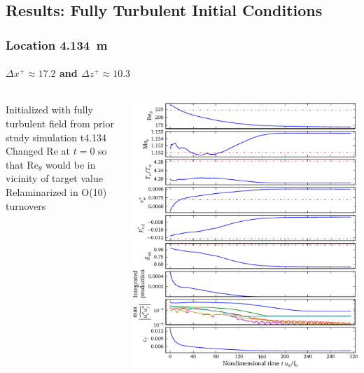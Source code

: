 \documentclass[mathserif]{beamer}
\begin{document}
\subsection{Results: Fully Turbulent Initial Conditions}

\begin{frame}
    \frametitle{Location 4.134~m}
    \framesubtitle{$\Delta{}x^{+}\approx{}17.2$ and $\Delta{}z^{+}\approx{}10.3$}
    \begin{columns}[c,onlytextwidth]
    \begin{column}{.35\linewidth}
        \scriptsize
        Initialized with fully turbulent field from prior study simulation t4.134
        \\\bigskip
        Changed $\mbox{Re}$ at $t=0$ so that $\mbox{Re}_\theta$ would be in
        vicinity of target value\\\bigskip
        Relaminarized in O(10) turnovers
    \end{column}
    \begin{column}{.65\linewidth}
        \vspace{-3.75em}
        \begin{flushright}
            \includegraphics[height=0.99\textheight]{redux4134}
        \end{flushright}
    \end{column}
    \end{columns}
\end{frame}
\end{document}
